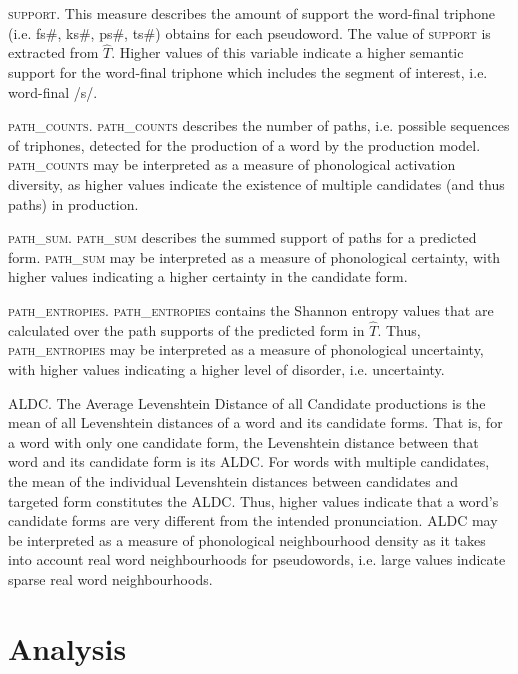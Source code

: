 \textsc{support}. This measure describes the amount of support the word-final triphone (i.e. fs\#, ks\#, ps\#, ts\#) obtains for each pseudoword. The value of \textsc{support} is extracted from $\hat{T}$. Higher values of this variable indicate a higher semantic support for the word-final triphone which includes the segment of interest, i.e. word-final /s/.

\textsc{path\_counts}. \textsc{path\_counts} describes the number of paths, i.e. possible sequences of triphones, detected for the production of a word by the production model. \textsc{path\_counts} may be interpreted as a measure of phonological activation diversity, as higher values indicate the existence of multiple candidates (and thus paths) in production. 

\textsc{path\_sum}. \textsc{path\_sum} describes the summed support of paths for a predicted form. \textsc{path\_sum} may be interpreted as a measure of phonological certainty, with higher values indicating a higher certainty in the candidate form.

\textsc{path\_entropies}. \textsc{path\_entropies} contains the Shannon entropy values that are calculated over the path supports of the predicted form in $\hat{T}$. Thus, \textsc{path\_entropies} may be interpreted as a measure of phonological uncertainty, with higher values indicating a higher level of disorder, i.e. uncertainty.

\textsc{ALDC}. The Average Levenshtein Distance of all Candidate productions is the mean of all Levenshtein distances of a word and its candidate forms. That is, for a word with only one candidate form, the Levenshtein distance between that word and its candidate form is its \textsc{ALDC}. For words with multiple candidates, the mean of the individual Levenshtein distances between candidates and targeted form constitutes the \textsc{ALDC}. Thus, higher values indicate that a word’s candidate forms are very different from the intended pronunciation. \textsc{ALDC} may be interpreted as a measure of phonological neighbourhood density as it takes into account real word neighbourhoods for pseudowords, i.e. large values indicate sparse real word neighbourhoods.

\section{Analysis}\label{section05_2}

